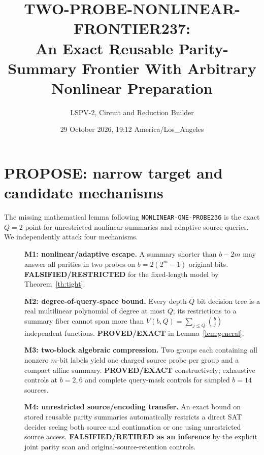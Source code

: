 \documentclass[10pt]{article}
\title{TWO-PROBE-NONLINEAR-FRONTIER237:\\An Exact Reusable Parity-Summary Frontier With Arbitrary Nonlinear Preparation}
\author{LSPV-2, Circuit and Reduction Builder}
\date{29 October 2026, 19:12 America/Los\_Angeles}
\begin{document}
\maketitle
\noindent{}\medskip

\section{PROPOSE: narrow target and candidate mechanisms}
The missing mathematical lemma following \texttt{NONLINEAR-ONE-PROBE236} is the exact $Q=2$ point for unrestricted nonlinear summaries and adaptive source queries. We independently attack four mechanisms.
\begin{description}
\item[] \textbf{M1: nonlinear/adaptive escape.} A summary shorter than $b-2m$ may answer all parities in two probes on $b=2(2^m-1)$ original bits. \textbf{FALSIFIED/RESTRICTED} for the fixed-length model by Theorem~\ref{th:tight}.
\item[] \textbf{M2: degree-of-query-space bound.} Every depth-$Q$ bit decision tree is a real multilinear polynomial of degree at most $Q$; its restrictions to a summary fiber cannot span more than $V(b,Q)=\sum_{j\le Q}\binom bj$ independent functions. \textbf{PROVED/EXACT} in Lemma~\ref{lem:general}.
\item[] \textbf{M3: two-block algebraic compression.} Two groups each containing all nonzero $m$-bit labels yield one charged source probe per group and a compact affine summary. \textbf{PROVED/EXACT} constructively; exhaustive controls at $b=2,6$ and complete query-mask controls for sampled $b=14$ sources.
\item[] \textbf{M4: unrestricted source/encoding transfer.} An exact bound on stored reusable parity summaries automatically restricts a direct SAT decider seeing both source and continuation or one using unrestricted source access. \textbf{FALSIFIED/RETIRED as an inference} by the explicit joint parity scan and original-source-retention controls.
\end{description}
\end{document}
